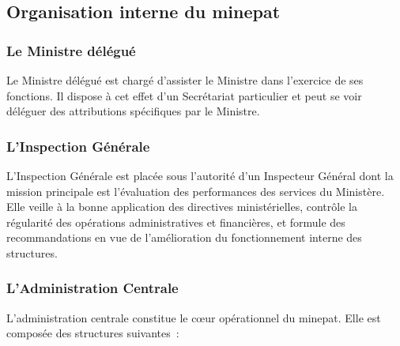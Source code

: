 \documentclass[12pt, a4paper, oneside]{report}
\begin{document}
\subsection{Organisation interne du \gls{minepat}}

\subsubsection{Le Ministre délégué}

Le Ministre délégué est chargé d'assister le Ministre dans l'exercice de ses fonctions.
Il dispose à cet effet d'un Secrétariat particulier et peut se voir déléguer des
attributions spécifiques par le Ministre.

\subsubsection{L'Inspection Générale}

L'Inspection Générale est placée sous l'autorité d'un Inspecteur Général dont la
mission principale est l'évaluation des performances des services du Ministère. Elle
veille à la bonne application des directives ministérielles, contrôle la régularité des
opérations administratives et financières, et formule des recommandations en vue de
l'amélioration du fonctionnement interne des structures.

\subsubsection{L'Administration Centrale}

L'administration centrale constitue le c\oe ur opérationnel du \gls{minepat}. Elle est
composée des structures suivantes~:
\end{document}
